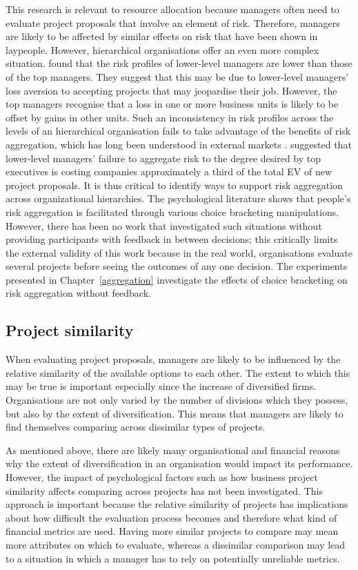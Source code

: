 \documentclass[a4paper, nobind, dvipsnames]{templates/ociamthesis}
\theoremstyle{definition}
\theoremstyle{definition}
\theoremstyle{definition}
\theoremstyle{definition}
\theoremstyle{remark}
\begin{document}
This research is relevant to resource allocation because managers often need to
evaluate project proposals that involve an element of risk. Therefore, managers
are likely to be affected by similar effects on risk that have been shown in
laypeople. However, hierarchical organisations offer an even more complex
situation. \textcite{lovallo2020} found that the risk profiles of lower-level managers are
lower than those of the top managers. They suggest that this may be due to
lower-level managers' loss aversion to accepting projects that may jeopardise
their job. However, the top managers recognise that a loss in one or more
business units is likely to be offset by gains in other units. Such an
inconsistency in risk profiles across the levels of an hierarchical organisation
fails to take advantage of the benefits of risk aggregation, which has long been
understood in external markets \autocite{markowitz1952}. \textcite{lovallo2020} suggested that
lower-level managers' failure to aggregate risk to the degree desired by top
executives is costing companies approximately a third of the total EV of new
project proposals. It is thus critical to identify ways to support risk
aggregation across organizational hierarchies. The psychological literature
shows that people's risk aggregation is facilitated through various choice
bracketing manipulations. However, there has been no work that investigated such
situations without providing participants with feedback in between decisions;
this critically limits the external validity of this work because in the real
world, organisations evaluate several projects before seeing the outcomes of any
one decision. The experiments presented in Chapter~\ref{aggregation}
investigate the effects of choice bracketing on risk aggregation without
feedback.

\subsection{Project similarity}

When evaluating project proposals, managers are likely to be influenced by the
relative similarity of the available options to each other. The extent to which
this may be true is important especially since the increase of diversified
firms. Organisations are not only varied by the number of divisions which they
possess, but also by the extent of diversification. This means that managers are
likely to find themselves comparing across dissimilar types of projects.

As mentioned above, there are likely many organisational and financial reasons
why the extent of diversification in an organisation would impact its
performance. However, the impact of psychological factors such as how business
project similarity affects comparing across projects has not been investigated.
This approach is important because the relative similarity of projects has
implications about how difficult the evaluation process becomes and therefore
what kind of financial metrics are used. Having more similar projects to compare
may mean more attributes on which to evaluate, whereas a dissimilar comparison
may lead to a situation in which a manager has to rely on potentially unreliable
metrics.
\end{document}
